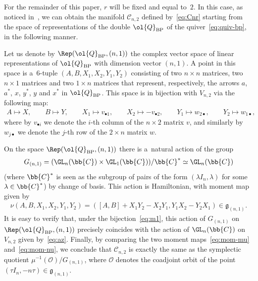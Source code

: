 For the remainder of this paper, \(r\) will be f\/ixed and equal to~\(2\).
In this case, as noticed in~\cite{bp08}, we can obtain the manifold \(\mathcal{C}_{n,2}\) def\/ined
by~\eqref{eq:Cnr} starting from the space of representations of the double \(\ol{Q}_{\mathrm{BP}}\) of the
quiver~\eqref{eq:quiv-bp}, in the following manner.

Let us denote by \(\Rep(\ol{Q}_{\mathrm{BP}},(n,1))\) the complex vector space of linear representations of
\(\ol{Q}_{\mathrm{BP}}\) with dimension vector \((n,1)\).
A point in this space is a~\(6\)-tuple \((A,B,X_{1},X_{2},Y_{1},Y_{2})\) consisting of two \(n\times n\)
matrices, two \(n\times 1\) matrices and two \(1\times n\) matrices that represent, respectively, the
arrows \(a\), \(a^{*}\), \(x\), \(y^{*}\), \(y\) and \(x^{*}\) in \(\ol{Q}_{\mathrm{BP}}\).
This space is in bijection with \(V_{n,2}\) via the following map:
\begin{gather}
\label{eq:m1}
A\mapsto X,
\qquad
B\mapsto Y,
\qquad
X_{1}\mapsto v_{\bullet1},
\qquad
X_{2}\mapsto-v_{\bullet2},
\qquad
Y_{1}\mapsto w_{2\bullet},
\qquad
Y_{2}\mapsto w_{1\bullet},
\end{gather}
where by \(v_{\bullet i}\) we denote the \(i\)-th column of the \(n\times 2\) matrix \(v\), and similarly
by \(w_{j\bullet}\) we denote the \(j\)-th row of the \(2\times n\) matrix \(w\).

On the space \(\Rep(\ol{Q}_{\mathrm{BP}},(n,1))\) there is a~natural action of the group
\begin{gather*}
G_{(n,1)}=(\GL_{n}(\bb{C})\times\GL_{1}(\bb{C}))/\bb{C}^{*}\simeq\GL_{n}(\bb{C})
\end{gather*}
(where \(\bb{C}^{*}\) is seen as the subgroup of pairs of the form \((\lambda I_{n},\lambda)\) for some
\(\lambda\in \bb{C}^{*}\)) by change of basis.
This action is Hamiltonian, with moment map given by
\begin{gather}
\label{eq:mom-nu}
\nu(A,B,X_{1},X_{2},Y_{1},Y_{2})=([A,B]+X_{1}Y_{2}-X_{2}Y_{1},Y_{1}X_{2}-Y_{2}X_{1})\in\mathfrak{g}_{(n,1)}.
\end{gather}
It is easy to verify that, under the bijection~\eqref{eq:m1}, this action of \(G_{(n,1)}\) on
\(\Rep(\ol{Q}_{\mathrm{BP}},(n,1))\) precisely coincides with the action of \(\GL_{n}(\bb{C})\) on
\(V_{n,2}\) given by~\eqref{eq:az}.
Finally, by comparing the two moment maps~\eqref{eq:mom-mu} and~\eqref{eq:mom-nu}, we conclude that
\(\mathcal{C}_{n,2}\) is exactly the same as the symplectic quotient \(\mu^{-1}(\mathcal{O})/G_{(n,1)}\),
where \(\mathcal{O}\) denotes the coadjoint orbit of the point \((\tau I_{n}, -n\tau)\in
\mathfrak{g}_{(n,1)}\).

